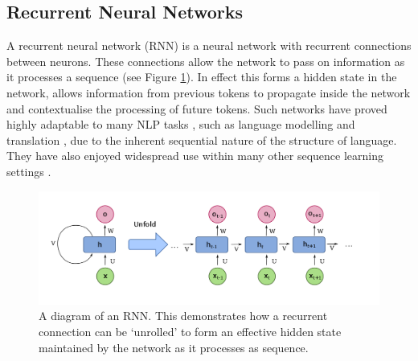 
\subsection{Recurrent Neural Networks} %
\label{sub:recurrent_neural_networks}

A recurrent neural network (RNN) is a neural network with recurrent connections between neurons. These connections allow the network to pass on information as it processes a sequence (see Figure \ref{fig:unrolled_lstm}). In effect this forms a hidden state in the network,  allows information from previous tokens to propagate inside the network and contextualise the processing of future tokens.
Such networks have proved highly adaptable to many NLP tasks \citep{young_recent_2017}, such as language modelling \citep{t._mikolov_extensions_2011} and translation \citep{liu_recursive_2014}, due to the inherent sequential nature of the structure of language. They have also enjoyed widespread use within many other sequence learning settings \citep{lipton_critical_2015} .

\begin{figure}[h]
    \centering
    \includegraphics[width=.9\linewidth]{ModelPics/rnn_wiki.png}
    \caption{A diagram of an RNN.\protect\footnotemark 
    This demonstrates how a recurrent connection can be `unrolled' to form an effective hidden state maintained by the network as it processes as sequence.}
    \label{fig:unrolled_lstm}
\end{figure}

